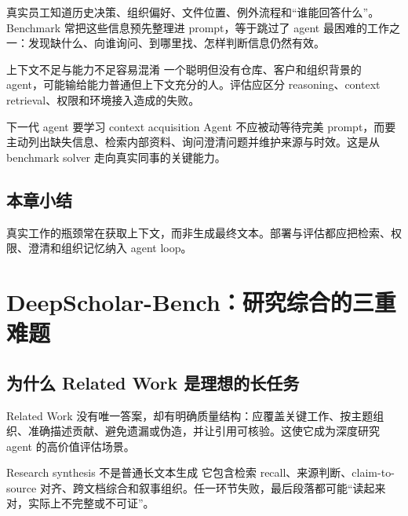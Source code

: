 \documentclass[a4paper]{article}
\begin{document}
真实员工知道历史决策、组织偏好、文件位置、例外流程和“谁能回答什么”。Benchmark 常把这些信息预先整理进 prompt，等于跳过了 agent 最困难的工作之一：发现缺什么、向谁询问、到哪里找、怎样判断信息仍然有效。

\begin{warningbox}{上下文不足与能力不足容易混淆}
一个聪明但没有仓库、客户和组织背景的 agent，可能输给能力普通但上下文充分的人。评估应区分 reasoning、context retrieval、权限和环境接入造成的失败。
\end{warningbox}

\begin{importantbox}{下一代 agent 要学习 context acquisition}
Agent 不应被动等待完美 prompt，而要主动列出缺失信息、检索内部资料、询问澄清问题并维护来源与时效。这是从 benchmark solver 走向真实同事的关键能力。
\end{importantbox}


\subsection{本章小结}

真实工作的瓶颈常在获取上下文，而非生成最终文本。部署与评估都应把检索、权限、澄清和组织记忆纳入 agent loop。

\section{DeepScholar-Bench：研究综合的三重难题}

\subsection{为什么 Related Work 是理想的长任务}



Related Work 没有唯一答案，却有明确质量结构：应覆盖关键工作、按主题组织、准确描述贡献、避免遗漏或伪造，并让引用可核验。这使它成为深度研究 agent 的高价值评估场景。

\begin{knowledgebox}{Research synthesis 不是普通长文本生成}
它包含检索 recall、来源判断、claim-to-source 对齐、跨文档综合和叙事组织。任一环节失败，最后段落都可能“读起来对，实际上不完整或不可证”。
\end{knowledgebox}
\end{document}

